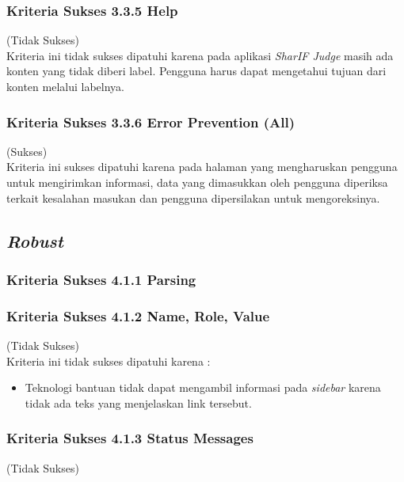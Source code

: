\documentclass[a4paper,twoside]{article}
\begin{document}
\begin{enumerate}
		\subsubsection*{Kriteria Sukses 3.3.5 Help}
		\label{subsubsec:kepatuhan_kriteria_3.3.5}
		(Tidak Sukses) \\
		
		Kriteria ini tidak sukses dipatuhi karena
		pada aplikasi \textit{SharIF Judge} masih ada konten yang tidak diberi label. Pengguna harus dapat mengetahui tujuan dari konten melalui labelnya.
		
		\subsubsection*{Kriteria Sukses 3.3.6 Error Prevention (All)}
		\label{subsubsec:kepatuhan_kriteria_3.3.6}
		(Sukses) \\
		
		Kriteria ini sukses dipatuhi karena pada halaman yang mengharuskan pengguna untuk mengirimkan informasi, data yang dimasukkan oleh pengguna diperiksa terkait kesalahan masukan dan pengguna dipersilakan untuk mengoreksinya.
		
		\subsection*{\textit{Robust}}
		\label{subsec:kepatuhan_robust}
		
		\subsubsection*{Kriteria Sukses 4.1.1 Parsing}
		\label{subsubsec:kepatuhan_kriteria_4.1.1}
		
		\subsubsection*{Kriteria Sukses 4.1.2 Name, Role, Value}
		\label{subsubsec:kepatuhan_kriteria_4.1.2}
		(Tidak Sukses) \\
		
		Kriteria ini tidak sukses dipatuhi karena : 
		\begin{itemize}
			\item Teknologi bantuan tidak dapat mengambil informasi pada \textit{sidebar} karena tidak ada teks yang menjelaskan link tersebut.
		\end{itemize}
		
		\subsubsection*{Kriteria Sukses 4.1.3 Status Messages}
		\label{subsubsec:kepatuhan_kriteria_4.1.3}
		(Tidak Sukses) \\
		

\end{enumerate}
\end{document}

